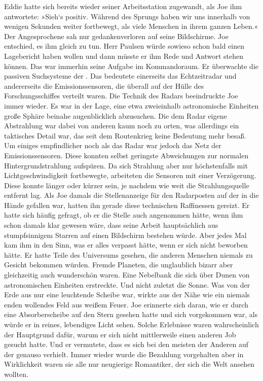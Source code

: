 Eddie hatte sich bereits wieder seiner Arbeitsstation zugewandt, als Joe ihm antwortete: »Sieh‘s positiv. Während des Sprungs haben wir uns innerhalb von wenigen Sekunden weiter fortbewegt, als viele Menschen in ihrem ganzen Leben.«
Der Angesprochene sah nur gedankenverloren auf seine Bildschirme. Joe entschied, es ihm gleich zu tun. Herr Paulsen würde sowieso schon bald einen Lagebericht haben wollen und dann müsste er ihm Rede und Antwort stehen können. Das war immerhin seine Aufgabe im Kommandoraum.
Er überwachte die passiven Suchsysteme der . Das bedeutete einerseits das Echtzeitradar und andererseits die Emissionssensoren, die überall auf der Hülle des Forschungsschiffes verteilt waren. Die Technik des Radars beeindruckte Joe immer wieder. Es war in der Lage, eine etwa zweieinhalb astronomische Einheiten große Sphäre beinahe augenblicklich abzusuchen. Die dem Radar eigene Abstrahlung war dabei von anderen kaum noch zu orten, was allerdings ein taktisches Detail war, das seit dem Routenkrieg keine Bedeutung mehr besaß.
Um einiges empfindlicher noch als das Radar war jedoch das Netz der Emissionssensoren. Diese konnten selbst geringste Abweichungen zur normalen Hintergrundstrahlung aufspüren. Da sich Strahlung aber nur höchstenfalls mit Lichtgeschwindigkeit fortbewegte, arbeiteten die Sensoren mit einer Verzögerung. Diese konnte länger oder kürzer sein, je nachdem wie weit die Strahlungsquelle entfernt lag.
Als Joe damals die Stellenanzeige für den Radarposten auf der  in die Hände gefallen war, hatten ihn gerade diese technischen Raffinessen gereizt. Er hatte sich häufig gefragt, ob er die Stelle auch angenommen hätte, wenn ihm schon damals klar gewesen wäre, dass seine Arbeit hauptsächlich aus stumpfsinnigem Starren auf einen Bildschirm bestehen würde. Aber jedes Mal kam ihm in den Sinn, was er alles verpasst hätte, wenn er sich nicht beworben hätte.
Er hatte Teile des Universums gesehen, die anderen Menschen niemals zu Gesicht bekommen würden. Fremde Planeten, die unglaublich bizarr aber gleichzeitig auch wunderschön waren. Eine Nebelbank die sich über Dunen von astronomischen Einheiten erstreckte. Und nicht zuletzt die Sonne. Was von der Erde aus nur eine leuchtende Scheibe war, wirkte aus der Nähe wie ein niemals enden wollendes Feld aus weißem Feuer. Joe erinnerte sich daran, wie er durch eine Absorberscheibe auf den Stern gesehen hatte und sich vorgekommen war, als würde er in reines, lebendiges Licht sehen.
Solche Erlebnisse waren wahrscheinlich der Hauptgrund dafür, warum er sich nicht mittlerweile einen anderen Job gesucht hatte. Und er vermutete, dass es sich bei den meisten der Anderen auf der  genauso verhielt. Immer wieder wurde die Bezahlung vorgehalten aber in Wirklichkeit waren sie alle nur neugierige Romantiker, der sich die Welt ansehen wollten.
